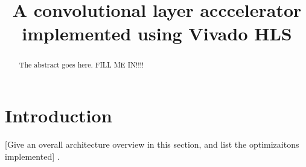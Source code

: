 \documentclass[conference]{IEEEtran}
\begin{document}
%
\title{A convolutional layer acccelerator implemented using Vivado HLS}


\author{
}







\maketitle

\begin{abstract}
The abstract goes here. FILL ME IN!!!!
\end{abstract}





%
\IEEEpeerreviewmaketitle



\section{Introduction}
[Give an overall architecture overview in this section, and list the optimizaitons implemented] \cite{vgg}.
\end{document}
